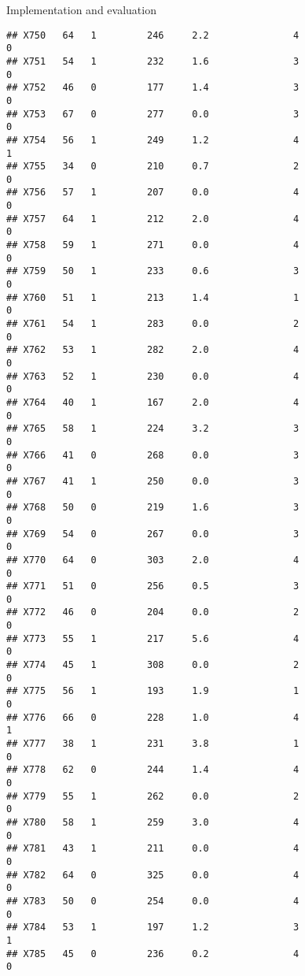 \documentclass[
  ignorenonframetext,
]{beamer}
\begin{document}
\begin{frame}[fragile]{Implementation and evaluation}
\begin{verbatim}
## X750   64   1         246     2.2               4                   0
## X751   54   1         232     1.6               3                   0
## X752   46   0         177     1.4               3                   0
## X753   67   0         277     0.0               3                   0
## X754   56   1         249     1.2               4                   1
## X755   34   0         210     0.7               2                   0
## X756   57   1         207     0.0               4                   0
## X757   64   1         212     2.0               4                   0
## X758   59   1         271     0.0               4                   0
## X759   50   1         233     0.6               3                   0
## X760   51   1         213     1.4               1                   0
## X761   54   1         283     0.0               2                   0
## X762   53   1         282     2.0               4                   0
## X763   52   1         230     0.0               4                   0
## X764   40   1         167     2.0               4                   0
## X765   58   1         224     3.2               3                   0
## X766   41   0         268     0.0               3                   0
## X767   41   1         250     0.0               3                   0
## X768   50   0         219     1.6               3                   0
## X769   54   0         267     0.0               3                   0
## X770   64   0         303     2.0               4                   0
## X771   51   0         256     0.5               3                   0
## X772   46   0         204     0.0               2                   0
## X773   55   1         217     5.6               4                   0
## X774   45   1         308     0.0               2                   0
## X775   56   1         193     1.9               1                   0
## X776   66   0         228     1.0               4                   1
## X777   38   1         231     3.8               1                   0
## X778   62   0         244     1.4               4                   0
## X779   55   1         262     0.0               2                   0
## X780   58   1         259     3.0               4                   0
## X781   43   1         211     0.0               4                   0
## X782   64   0         325     0.0               4                   0
## X783   50   0         254     0.0               4                   0
## X784   53   1         197     1.2               3                   1
## X785   45   0         236     0.2               4                   0

\end{verbatim}
\end{frame}
\end{document}
